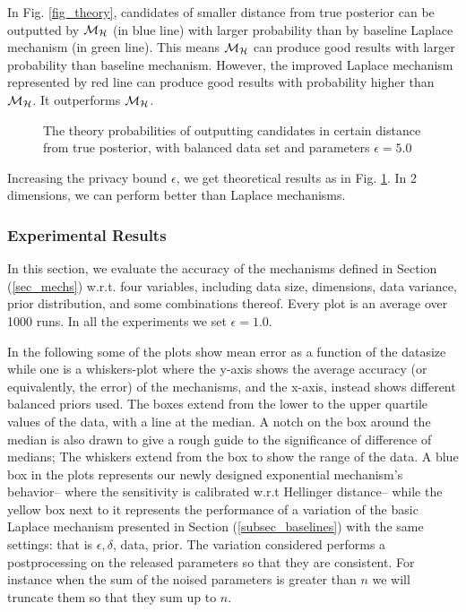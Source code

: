 \documentclass{article}
\begin{document}
In Fig. \ref{fig_theory}, candidates of smaller distance from true posterior can be outputted by $\mathcal{M}_{\mathcal{H}}$ (in blue line) with larger probability than by baseline Laplace mechanism (in green line). This means $\mathcal{M}_{\mathcal{H}}$ can produce good results with larger probability than baseline mechanism. However, the improved Laplace mechanism represented by red line can produce good results with probability higher than $\mathcal{M}_{\mathcal{H}}$. It outperforms $\mathcal{M}_{\mathcal{H}}$.

\begin{figure}
\begin{center}
\centering
\caption{The theory probabilities of outputting candidates in certain distance from true posterior, with balanced data set and parameters $\epsilon = 5.0$}
\label{fig_theory_epsilon}
\end{center}
\end{figure}
Increasing the privacy bound $\epsilon$, we get theoretical results as in Fig. \ref{fig_theory_epsilon}. In 2 dimensions, we can perform better than Laplace mechanisms.

\subsubsection{Experimental Results}
\label{subsec_vs_variables}

In this section, we evaluate the accuracy of the mechanisms defined in
Section (\ref{sec_mechs}) w.r.t. four variables, including data size, dimensions,
data variance, prior distribution, and some combinations thereof.
Every plot is an average over 1000 runs. In all the experiments we set
$\epsilon = 1.0$.

\noindent In the following some of the plots show
mean error as a function of the datasize while one
is a whiskers-plot where the y-axis shows the average
accuracy (or equivalently, the error) of the mechanisms, and the x-axis, instead shows
different balanced priors used. The boxes extend from the lower to the upper quartile values
of the data, with a line at the median. A notch on the box around the
median is also drawn to give a rough guide to the significance of
difference of medians; The whiskers extend from the box to show the
range of the data. A blue box in the plots represents our newly
designed exponential mechanism's behavior-- where the sensitivity is calibrated
w.r.t Hellinger distance-- while the yellow box next to
it represents the performance of a variation of the basic Laplace
mechanism presented in Section (\ref{subsec_baselines}) with the same
settings: that is $\epsilon, \delta$, data, prior. The variation
considered performs a postprocessing on the released parameters so
that they are consistent. For instance when the sum of the noised
parameters is greater than $n$ we will truncate them so that they sum
up to $n$.
\end{document}
